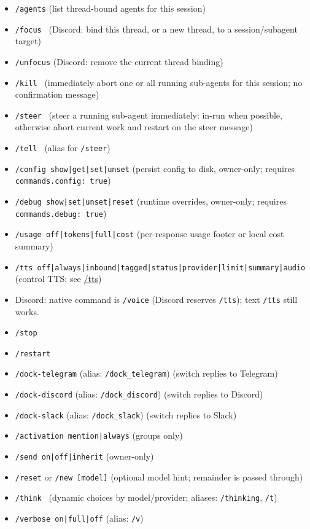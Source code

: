 \begin{itemize}
  \item \texttt{/agents} (list thread-bound agents for this session)
  \item \texttt{/focus } (Discord: bind this thread, or a new thread, to a session/subagent target)
  \item \texttt{/unfocus} (Discord: remove the current thread binding)
  \item \texttt{/kill } (immediately abort one or all running sub-agents for this session; no confirmation message)
  \item \texttt{/steer  } (steer a running sub-agent immediately: in-run when possible, otherwise abort current work and restart on the steer message)
  \item \texttt{/tell  } (alias for \texttt{/steer})
  \item \texttt{/config show|get|set|unset} (persist config to disk, owner-only; requires \texttt{commands.config: true})
  \item \texttt{/debug show|set|unset|reset} (runtime overrides, owner-only; requires \texttt{commands.debug: true})
  \item \texttt{/usage off|tokens|full|cost} (per-response usage footer or local cost summary)
  \item \texttt{/tts off|always|inbound|tagged|status|provider|limit|summary|audio} (control TTS; see \href{/tts}{/tts})
  \item Discord: native command is \texttt{/voice} (Discord reserves \texttt{/tts}); text \texttt{/tts} still works.
  \item \texttt{/stop}
  \item \texttt{/restart}
  \item \texttt{/dock-telegram} (alias: \texttt{/dock\_telegram}) (switch replies to Telegram)
  \item \texttt{/dock-discord} (alias: \texttt{/dock\_discord}) (switch replies to Discord)
  \item \texttt{/dock-slack} (alias: \texttt{/dock\_slack}) (switch replies to Slack)
  \item \texttt{/activation mention|always} (groups only)
  \item \texttt{/send on|off|inherit} (owner-only)
  \item \texttt{/reset} or \texttt{/new [model]} (optional model hint; remainder is passed through)
  \item \texttt{/think } (dynamic choices by model/provider; aliases: \texttt{/thinking}, \texttt{/t})
  \item \texttt{/verbose on|full|off} (alias: \texttt{/v})

\end{itemize}
